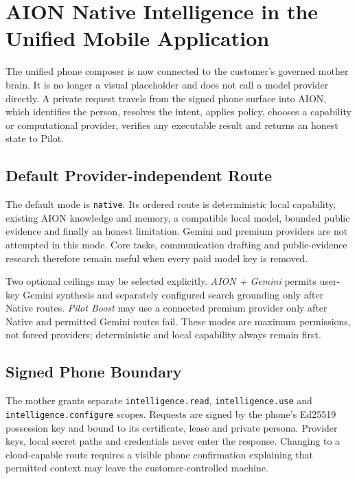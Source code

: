\begingroup
\sloppy
\setlength{\emergencystretch}{3em}
\section{AION Native Intelligence in the Unified Mobile Application}
\label{sec:pilot-unified-mobile-aion-native}

The unified phone composer is now connected to the customer's governed mother brain.  It is no
longer a visual placeholder and does not call a model provider directly.  A private request travels
from the signed phone surface into AION, which identifies the person, resolves the intent, applies
policy, chooses a capability or computational provider, verifies any executable result and returns
an honest state to Pilot.

\subsection{Default Provider-independent Route}

The default mode is \texttt{native}.  Its ordered route is deterministic local capability, existing
AION knowledge and memory, a compatible local model, bounded public evidence and finally an honest
limitation.  Gemini and premium providers are not attempted in this mode.  Core tasks,
communication drafting and public-evidence research therefore remain useful when every paid model
key is removed.

Two optional ceilings may be selected explicitly.  \emph{AION + Gemini} permits user-key Gemini
synthesis and separately configured search grounding only after Native routes.  \emph{Pilot Boost}
may use a connected premium provider only after Native and permitted Gemini routes fail.  These
modes are maximum permissions, not forced providers; deterministic and local capability always
remain first.

\subsection{Signed Phone Boundary}

The mother grants separate \texttt{intelligence.read}, \texttt{intelligence.use} and
\texttt{intelligence.configure} scopes.  Requests are signed by the phone's Ed25519 possession key
and bound to its certificate, lease and private persona.  Provider keys, local secret paths and
credentials never enter the response.  Changing to a cloud-capable route requires a visible phone
confirmation explaining that permitted context may leave the customer-controlled machine.

